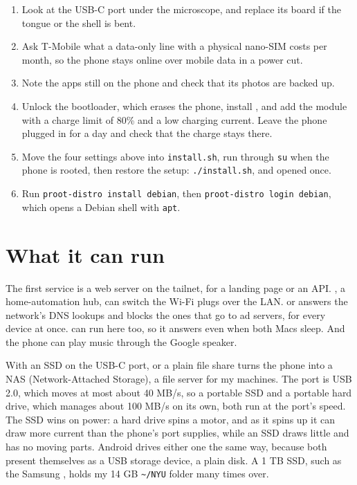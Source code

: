 \documentclass[11pt,a4paper]{article}
\begin{document}
\begin{enumerate}[leftmargin=2em,itemsep=1pt]
\item Look at the USB-C port under the microscope, and replace its board if the tongue or the shell is bent.

\item Ask T-Mobile what a data-only line with a physical nano-SIM costs per month, so the phone stays online over mobile data in a power cut.
\item Note the apps still on the phone and check that its photos are backed up.
\item Unlock the bootloader, which erases the phone, install , and add the  module with a charge limit of 80\% and a low charging current. Leave the phone plugged in for a day and check that the charge stays there.
 \item Move the four settings above into \texttt{install.sh}, run through \texttt{su} when the phone is rooted, then restore the setup: \texttt{./install.sh}, and  opened once.
\item Run \texttt{proot-distro install debian}, then \texttt{proot-distro login debian}, which opens a Debian shell with \texttt{apt}.
\end{enumerate}

\section*{What it can run}

The first service is a web server on the tailnet, for a landing page or an API. , a home-automation hub, can switch the Wi-Fi plugs over the LAN.  or  answers the network's DNS lookups and blocks the ones that go to ad servers, for every device at once.  can run here too, so it answers even when both Macs sleep.  And the phone can play music through the Google speaker.

 With an SSD on the USB-C port,  or a plain file share turns the phone into a NAS (Network-Attached Storage), a file server for my machines. The port is USB 2.0, which moves at most about 40 MB/s, so a portable SSD and a portable hard drive, which manages about 100 MB/s on its own, both run at the port's speed. The SSD wins on power: a hard drive spins a motor, and as it spins up it can draw more current than the phone's port supplies, while an SSD draws little and has no moving parts. Android drives either one the same way, because both present themselves as a USB storage device, a plain disk. A 1 TB SSD, such as the Samsung , holds my 14 GB \texttt{\textasciitilde/NYU} folder many times over.
\end{document}
